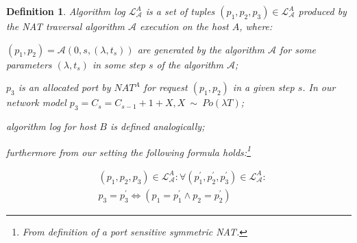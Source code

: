 \documentclass{llncs}
\newtheorem{mydef}{Definition}
\begin{document}
\begin{mydef}
\label{def:log}
Algorithm log $\mathcal{L}^A_{\mathcal{A}}$ is a set of tuples $(p_1, p_2, p_3) \in \mathcal{L}^A_{\mathcal{A}}$ produced
by the NAT traversal algorithm $\mathcal{A}$ execution on the host $A$, where: \\

\begin{compactitem}
 \item $(p_1, p_2) = \mathcal{A}(0, s, (\lambda, t_s)) $ are generated by the algorithm $\mathcal{A}$ for some 
       parameters $(\lambda, t_s)$ in some step $s$ of the algorithm $\mathcal{A}$;
 \item $p_3$ is an allocated port by $NAT^A$ for request $(p_1, p_2)$ in a given step $s$. In our network model
       $p_3=C_s=C_{s-1} + 1 + X, X~\sim~Po(\lambda T)$;
 \item algorithm log for host $B$ is defined analogically;
 \item furthermore from our setting the following formula holds:\footnote{From definition of a port sensitive symmetric NAT.}
\end{compactitem} %
%
%
\begin{align*}
& (p_1, p_2, p_3) \in \mathcal{L}^A_{\mathcal{A}}: \forall (p_1^{\prime}, p_2^{\prime}, p_3^{\prime}) \in \mathcal{L}^{A}_{\mathcal{A}} :\\
& p_3 = p_3^{\prime} \Leftrightarrow \left( p_1=p^{\prime}_1 \wedge p_2=p^{\prime}_2 \right)
\end{align*}
\end{mydef}
\end{document}
